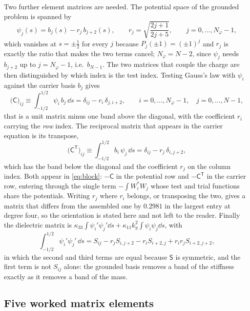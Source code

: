 Two further element matrices are needed.  The potential space of the grounded
problem is spanned by
\begin{equation}
\label{eq:app_pot}
\psi_j(s)=b_j(s)-r_j\,b_{j+2}(s),\qquad
r_j=\sqrt{\frac{2j+1}{2j+5}},\qquad j=0,\dots,N_\varphi-1 ,
\end{equation}
which vanishes at $s=\pm\tfrac12$ for every $j$ because $P_j(\pm1)=(\pm1)^j$ and
$r_j$ is exactly the ratio that makes the two terms cancel; $N_\varphi=N-2$,
since $\psi_j$ needs $b_{j+2}$ up to $j=N_\varphi-1$, i.e.\ $b_{N-1}$.  The two
matrices that couple the charge are then distinguished by which index is the test
index.  Testing Gauss's law with $\psi_i$ against the carrier basis $b_j$ gives
\begin{equation}
\label{eq:app_charge}
\bigl(\mathsf C\bigr)_{ij}\equiv\int_{-1/2}^{1/2}\psi_i\,b_j\,\dd s
=\delta_{ij}-r_i\,\delta_{j,i+2},
\qquad i=0,\dots,N_\varphi-1,\quad j=0,\dots,N-1 ,
\end{equation}
that is a unit matrix minus one band above the diagonal, with the coefficient
$r_i$ carrying the \emph{row} index.  The reciprocal matrix that appears in the
carrier equation is its transpose,
\begin{equation}
\label{eq:app_charge_T}
\bigl(\mathsf C^{\mathsf T}\bigr)_{ij}\equiv\int_{-1/2}^{1/2}b_i\,\psi_j\,\dd s
=\delta_{ij}-r_j\,\delta_{i,j+2},
\end{equation}
which has the band below the diagonal and the coefficient $r_j$ on the column
index.  Both appear in \eqref{eq:block}: $-\mathsf C$ in the potential row and
$-\mathsf C^{\mathsf T}$ in the carrier row, entering through the single term
$-\int W_i^{*}W_j$ whose test and trial functions share the potentials.  Writing
$r_j$ where $r_i$ belongs, or transposing the two, gives a matrix that differs
from the assembled one by $0.2981$ in the largest entry at degree four, so the orientation is stated here and not left to the reader.  Finally
the dielectric matrix is
$\kappa_{33}\int\psi_i'\psi_j'\dd s+\kappa_{11}k_y^{2}\int\psi_i\psi_j\dd s$,
with
\begin{equation}
\label{eq:app_diel}
\int_{-1/2}^{1/2}\psi_i'\psi_j'\,\dd s
=S_{ij}-r_jS_{i,j+2}-r_iS_{i+2,j}+r_ir_jS_{i+2,j+2},
\end{equation}
in which the second and third terms are equal because $\mathsf S$ is symmetric,
and the first term is not $S_{ij}$ alone: the grounded basis removes a band of
the stiffness exactly as it removes a band of the mass.

\subsection{Five worked matrix elements}

